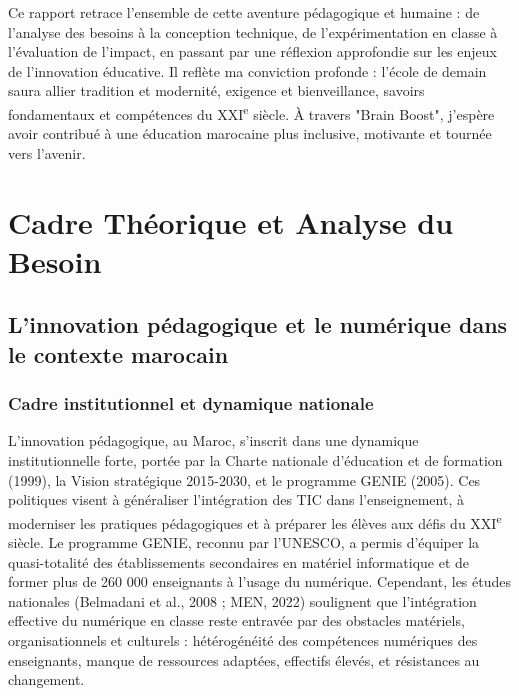 \documentclass[a4paper,11pt]{report}
\begin{document}
Ce rapport retrace l'ensemble de cette aventure pédagogique et humaine : de l'analyse des besoins à la conception technique, de l'expérimentation en classe à l'évaluation de l'impact, en passant par une réflexion approfondie sur les enjeux de l'innovation éducative. Il reflète ma conviction profonde : l'école de demain saura allier tradition et modernité, exigence et bienveillance, savoirs fondamentaux et compétences du XXI\textsuperscript{e} siècle. À travers "Brain Boost", j'espère avoir contribué à une éducation marocaine plus inclusive, motivante et tournée vers l'avenir.

\chapter{Cadre Théorique et Analyse du Besoin}

\section{L'innovation pédagogique et le numérique dans le contexte marocain}

\subsection{Cadre institutionnel et dynamique nationale}
L'innovation pédagogique, au Maroc, s'inscrit dans une dynamique institutionnelle forte, portée par la Charte nationale d'éducation et de formation (1999), la Vision stratégique 2015-2030, et le programme GENIE (2005). Ces politiques visent à généraliser l'intégration des TIC dans l'enseignement, à moderniser les pratiques pédagogiques et à préparer les élèves aux défis du XXI\textsuperscript{e} siècle. Le programme GENIE, reconnu par l'UNESCO, a permis d'équiper la quasi-totalité des établissements secondaires en matériel informatique et de former plus de 260 000 enseignants à l'usage du numérique. Cependant, les études nationales (Belmadani et al., 2008 ; MEN, 2022) soulignent que l'intégration effective du numérique en classe reste entravée par des obstacles matériels, organisationnels et culturels : hétérogénéité des compétences numériques des enseignants, manque de ressources adaptées, effectifs élevés, et résistances au changement.
\end{document}
